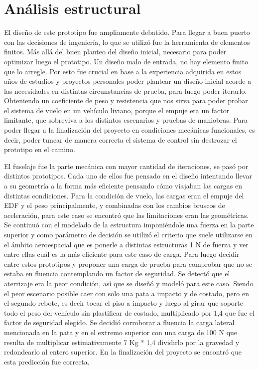 \section{Análisis estructural}\label{sec:fea}

El diseño de este prototipo fue ampliamente debatido. Para llegar a buen puerto con las decisiones de ingeniería, lo que se utilizó fue la herramienta de elementos finitos. Más allá del buen planteo del diseño inicial, necesario para poder optimizar luego el prototipo. Un diseño malo de entrada, no hay elemento finito que lo arregle. Por esto fue crucial en base a la experiencia adquirida en estos años de estudios y proyectos personales poder plantear un diseño inicial acorde a las necesidades en distintas circunstancias de prueba, para luego poder iterarlo. Obteniendo un coeficiente de peso y resistencia que nos sirva para poder probar el sistema de vuelo en un vehículo liviano, porque el empuje era un factor limitante, que sobreviva a los distintos escenarios y pruebas de maniobras. Para poder llegar a la finalización del proyecto en condiciones mecánicas funcionales, es decir, poder tunear de manera correcta el sistema de control sin destrozar el prototipo en el camino.

\medskip

El fuselaje fue la parte mecánica con mayor cantidad de iteraciones, se pasó por distintos prototipos. Cada uno de ellos fue pensado en el diseño intentando llevar a su geometría a la forma más eficiente pensando cómo viajaban las cargas en distintas condiciones. Para la condición de vuelo, las cargas eran el empuje del EDF y el peso  principalmente, y combinadas con los cambios bruscos de aceleración, para este caso se encontró que las limitaciones eran las geométricas. Se continuó con el modelado de la estructura imponiéndole una fuerza en la parte superior y como parámetro de decisión se utilizó el criterio que suele utilizarse en el ámbito aeroespacial que es ponerle a distintas estructuras 1 N de fuerza y ver entre ellas cuál es la más eficiente para este caso de carga. Para luego decidir entre estos prototipos y proponer una carga de prueba para comprobar que no se estaba en fluencia contemplando un factor de seguridad. Se detectó que el aterrizaje era la peor condición, así que se diseñó y modeló para este caso. Siendo el peor escenario posible caer con solo una pata a impacto y de costado, pero en el segundo rebote, es decir tocar el piso a impacto y luego al girar que soporte todo el peso del vehículo sin plastificar de costado, multiplicado por 1,4 que fue el factor de seguridad elegido. Se decidió corroborar a fluencia la carga lateral mencionada en la pata y en el extremo superior con una carga de 100 N que resulta de multiplicar estimativamente 7 Kg * 1,4 dividirlo por la gravedad y redondearlo al entero superior. En la finalización del proyecto se encontró que esta predicción fue correcta.

